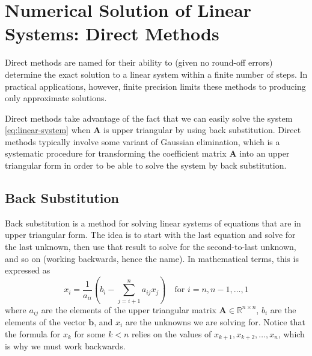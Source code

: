 \section{Numerical Solution of Linear Systems: Direct Methods}
\label{sec:num_sol_linear_direct}
Direct methods are named for their ability to (given no round-off errors) determine the exact solution to a linear system within a finite number of steps. In practical applications, however, finite precision limits these methods to producing only approximate solutions.

Direct methods take advantage of the fact that we can easily solve the system \autoref{eq:linear-system} when $ \mathbf{A} $ is upper triangular by using back substitution. Direct methods typically involve some variant of Gaussian elimination, which is a systematic procedure for transforming the coefficient matrix $ \mathbf{A} $ into an upper triangular form in order to be able to solve the system by back substitution. 

\subsection{Back Substitution}
Back substitution is a method for solving linear systems of equations that are in upper triangular form. The idea is to start with the last equation and solve for the last unknown, then use that result to solve for the second-to-last unknown, and so on (working backwards, hence the name). In mathematical terms, this is expressed as
\begin{equation*}
    x_i = \frac{1}{a_{ii}} \left( b_i - \sum_{j=i+1}^{n} a_{ij} x_j \right) \quad \text{for } i = n, n-1, \dots, 1
\end{equation*}
where $ a_{ij} $ are the elements of the upper triangular matrix $ \mathbf{A} \in \mathbb{R}^{n \times n} $, $ b_i $ are the elements of the vector $ \mathbf{b} $, and $ x_i $ are the unknowns we are solving for. Notice that the formula for $ x_k $ for some $k < n$ relies on the values of $ x_{k+1}, x_{k+2}, \dots, x_n $, which is why we must work backwards.

